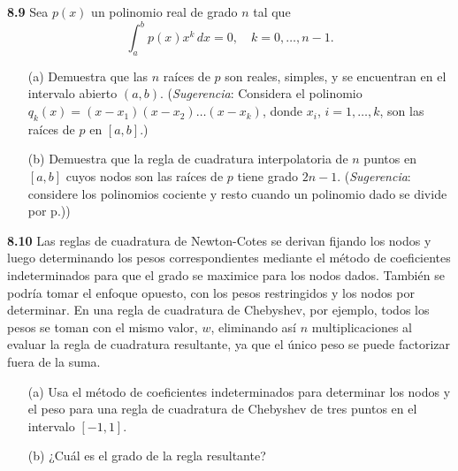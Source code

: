 \documentclass{article}
\begin{document}
\textbf{8.9} Sea \(p(x)\) un polinomio real de grado \(n\) tal que
\[
\int_a^b p(x) x^k \, dx = 0, \quad k = 0, \dots, n-1.
\]
\begin{itemize}
    \item[(a)] Demuestra que las \(n\) raíces de \(p\) son reales, simples, y se encuentran en el intervalo abierto \((a, b)\). (\textit{Sugerencia}: Considera el polinomio \(q_k(x) = (x - x_1)(x - x_2) \dots (x - x_k)\), donde \(x_i\), \(i = 1, \dots, k\), son las raíces de \(p\) en \([a, b]\).)
    \item[(b)] Demuestra que la regla de cuadratura interpolatoria de \(n\) puntos en \([a, b]\) cuyos nodos son las raíces de \(p\) tiene grado \(2n - 1\). (\textit{Sugerencia}: considere los polinomios cociente y resto cuando un polinomio dado se divide por p.))
\end{itemize}

\textbf{8.10} Las reglas de cuadratura de Newton-Cotes se derivan fijando los nodos y luego determinando los pesos correspondientes mediante el método de coeficientes indeterminados para que el grado se maximice para los nodos dados. También se podría tomar el enfoque opuesto, con los pesos restringidos y los nodos por determinar. En una regla de cuadratura de Chebyshev, por ejemplo, todos los pesos se toman con el mismo valor, \(w\), eliminando así \(n\) multiplicaciones al evaluar la regla de cuadratura resultante, ya que el único peso se puede factorizar fuera de la suma.
\begin{itemize}
    \item[(a)] Usa el método de coeficientes indeterminados para determinar los nodos y el peso para una regla de cuadratura de Chebyshev de tres puntos en el intervalo \([-1, 1]\).
    \item[(b)] ¿Cuál es el grado de la regla resultante?
\end{itemize}
\end{document}
